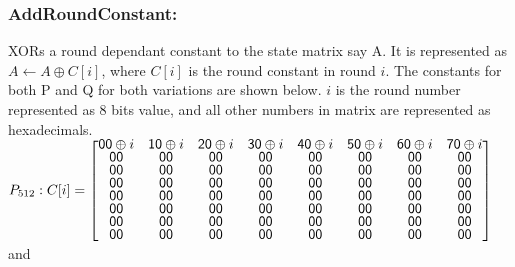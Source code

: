     \subsubsection{AddRoundConstant:} XORs a round dependant constant to the state matrix say A. It is represented as \\
    $A \gets A \oplus C[i]$, where $C[i]$ is the round constant in round $i$. The constants for both P and Q for both
    variations are shown below. $i$ is the round number represented as 8 bits value, and all other numbers in matrix
    are represented as hexadecimals.\\

    $ P_{512}: C[i] = \renewcommand\arraystretch{0.75}
    \begin{bmatrix}
      \mathsf{00} \oplus i & \mathsf{10} \oplus i & \mathsf{20} \oplus i & \mathsf{30} \oplus i & \mathsf{40} \oplus i & \mathsf{50} \oplus i & \mathsf{60} \oplus i & \mathsf{70} \oplus i \\
      \mathsf{00} & \mathsf{00} & \mathsf{00} & \mathsf{00} & \mathsf{00} & \mathsf{00} & \mathsf{00} & \mathsf{00} \\
      \mathsf{00} & \mathsf{00} & \mathsf{00} & \mathsf{00} & \mathsf{00} & \mathsf{00} & \mathsf{00} & \mathsf{00} \\
      \mathsf{00} & \mathsf{00} & \mathsf{00} & \mathsf{00} & \mathsf{00} & \mathsf{00} & \mathsf{00} & \mathsf{00} \\
      \mathsf{00} & \mathsf{00} & \mathsf{00} & \mathsf{00} & \mathsf{00} & \mathsf{00} & \mathsf{00} & \mathsf{00} \\
      \mathsf{00} & \mathsf{00} & \mathsf{00} & \mathsf{00} & \mathsf{00} & \mathsf{00} & \mathsf{00} & \mathsf{00} \\
      \mathsf{00} & \mathsf{00} & \mathsf{00} & \mathsf{00} & \mathsf{00} & \mathsf{00} & \mathsf{00} & \mathsf{00} \\
      \mathsf{00} & \mathsf{00} & \mathsf{00} & \mathsf{00} & \mathsf{00} & \mathsf{00} & \mathsf{00} & \mathsf{00} \\
    \end{bmatrix}$ \\

    and 

